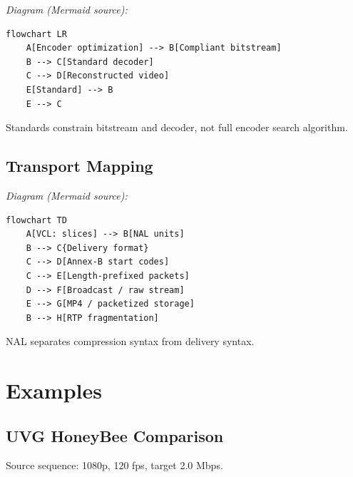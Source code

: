 \begin{center}\footnotesize\itshape Diagram (Mermaid source):\end{center}
\begin{verbatim}
flowchart LR
    A[Encoder optimization] --> B[Compliant bitstream]
    B --> C[Standard decoder]
    C --> D[Reconstructed video]
    E[Standard] --> B
    E --> C
\end{verbatim}

Standards constrain bitstream and decoder, not full encoder search algorithm.

\subsection{Transport Mapping}

\begin{center}\footnotesize\itshape Diagram (Mermaid source):\end{center}
\begin{verbatim}
flowchart TD
    A[VCL: slices] --> B[NAL units]
    B --> C{Delivery format}
    C --> D[Annex-B start codes]
    C --> E[Length-prefixed packets]
    D --> F[Broadcast / raw stream]
    E --> G[MP4 / packetized storage]
    B --> H[RTP fragmentation]
\end{verbatim}

NAL separates compression syntax from delivery syntax.

\section{Examples}

\subsection{UVG HoneyBee Comparison}

Source sequence: 1080p, 120 fps, target 2.0 Mbps.

\begin{center}
\end{center}

